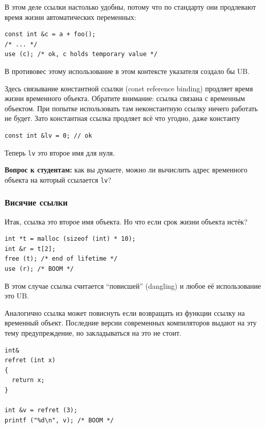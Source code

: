 \documentclass[a4paper,12pt,oneside]{article}
\newif\ifanswers
\begin{document}
В этом деле ссылки настолько удобны, потому что по стандарту они продлевают время жизни автоматических переменных:

\begin{lstlisting}
const int &c = a + foo();
/* ... */
use (c); /* ok, c holds temporary value */
\end{lstlisting}

В противовес этому использование в этом контексте указателя создало бы UB.

Здесь связывание константной ссылки (const reference binding) продляет время жизни временного объекта. Обратите внимание: ссылка связана с временным объектом. При попытке использовать там неконстантную ссылку ничего работать не будет. Зато константная ссылка продляет всё что угодно, даже константу

\begin{lstlisting}
const int &lv = 0; // ok
\end{lstlisting}

Теперь \lstinline!lv! это второе имя для нуля.

\textbf{Вопрос к студентам:} как вы думаете, можно ли вычислить адрес временного объекта на который ссылается \lstinline!lv!?

\ifanswers
Ответ: увы нет и, более того, сам этот объект не обязан существовать.
\fi

\subsubsection{Висячие ссылки}\label{DanglingRefs}

Итак, ссылка это второе имя объекта. Но что если срок жизни объекта истёк?

\begin{lstlisting}
int *t = malloc (sizeof (int) * 10);
int &r = t[2];
free (t); /* end of lifetime */
use (r); /* BOOM */ 
\end{lstlisting}

В этом случае ссылка считается ``повисшей'' (dangling) и любое её использование это UB.

Аналогично ссылка может повиснуть если возвращать из функции ссылку на временный объект. Последние версии современных компиляторов выдают на эту тему предупреждение, но закладываться на это не стоит.

\begin{lstlisting}
int& 
refret (int x)
{
  return x;
}

int &v = refret (3);
printf ("%d\n", v); /* BOOM */
\end{lstlisting}
\end{document}
